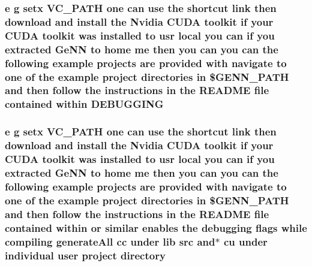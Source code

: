\hypertarget{README_8txt_aa8cc1c4c0e0bbfa3092bcd554c31770a}{
\subsubsection[{D\+E\+B\+U\+G\+G\+I\+N\+G}]{\setlength{\rightskip}{0pt plus 5cm}e g setx V\+C\+\_\+\+P\+A\+T\+H one can {\bf use} the shortcut link then download and install the Nvidia C\+U\+D\+A toolkit if your C\+U\+D\+A toolkit was installed {\bf to} usr local you can if you extracted {\bf Ge\+N\+N} {\bf to} home me then you can you can the following example projects are provided {\bf with} navigate {\bf to} one of the example {\bf project} directories {\bf in} \$G\+E\+N\+N\+\_\+\+P\+A\+T\+H and then follow the instructions {\bf in} the R\+E\+A\+D\+M\+E {\bf file} contained within D\+E\+B\+U\+G\+G\+I\+N\+G}}\label{README_8txt_aa8cc1c4c0e0bbfa3092bcd554c31770a}
\hypertarget{README_8txt_ae619b68020535fba5ac79522a0d9d1c4}{
\subsubsection[{directory}]{\setlength{\rightskip}{0pt plus 5cm}e g setx V\+C\+\_\+\+P\+A\+T\+H one can {\bf use} the shortcut link then download and install the Nvidia C\+U\+D\+A toolkit if your C\+U\+D\+A toolkit was installed {\bf to} usr local you can if you extracted {\bf Ge\+N\+N} {\bf to} home me then you can you can the following example projects are provided {\bf with} navigate {\bf to} one of the example {\bf project} directories {\bf in} \$G\+E\+N\+N\+\_\+\+P\+A\+T\+H and then follow the instructions {\bf in} the R\+E\+A\+D\+M\+E {\bf file} contained within {\bf or} similar enables the debugging flags while compiling generate\+All cc under lib src and$\ast$ cu under individual user {\bf project} directory}}\label{README_8txt_ae619b68020535fba5ac79522a0d9d1c4}
